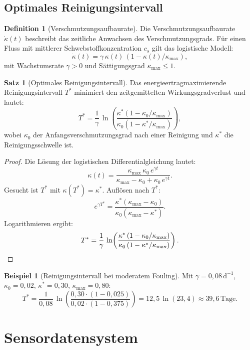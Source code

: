 ﻿\documentclass[a4paper,12pt]{article}
\theoremstyle{definition}
\newtheorem{definition}{Definition}
\newtheorem{beispiel}{Beispiel}
\newtheorem{satz}{Satz}
\begin{document}
\subsection{Optimales Reinigungsintervall}

\begin{definition}[Verschmutzungsaufbaurate]
Die Verschmutzungsaufbaurate $\dot{\kappa}(t)$ beschreibt das zeitliche Anwachsen des
Verschmutzungsgrads. Für einen Fluss mit mittlerer Schwebstoffkonzentration $c_s$
gilt das logistische Modell:
\[
  \dot{\kappa}(t) = \gamma\,\kappa(t)\,(1 - \kappa(t)/\kappa_{\max}),
\]
mit Wachstumsrate $\gamma > 0$ und Sättigungsgrad $\kappa_{\max} \leq 1$.
\end{definition}

\begin{satz}[Optimales Reinigungsintervall]
\label{satz:reinigung}
Das energieertragmaximierende Reinigungsintervall $T^*$ minimiert den zeitgemittelten
Wirkungsgradverlust und lautet:
\[
  T^* = \frac{1}{\gamma}\,\ln\!\left(\frac{\kappa^*(1 - \kappa_0/\kappa_{\max})}
       {\kappa_0(1 - \kappa^*/\kappa_{\max})}\right),
\]
wobei $\kappa_0$ der Anfangsverschmutzungsgrad nach einer Reinigung und $\kappa^*$ die
Reinigungsschwelle ist.
\end{satz}

\begin{proof}
Die Lösung der logistischen Differentialgleichung lautet:
\[
  \kappa(t) = \frac{\kappa_{\max}\,\kappa_0\,e^{\gamma t}}
              {\kappa_{\max} - \kappa_0 + \kappa_0\,e^{\gamma t}}.
\]
Gesucht ist $T^*$ mit $\kappa(T^*) = \kappa^*$. Auflösen nach $T^*$:
\[
  e^{\gamma T^*} = \frac{\kappa^*(\kappa_{\max} - \kappa_0)}{\kappa_0(\kappa_{\max} - \kappa^*)}.
\]
Logarithmieren ergibt:
\[
  T^* = \frac{1}{\gamma}\,\ln\!\left(\frac{\kappa^*\,(1 - \kappa_0/\kappa_{\max})}
       {\kappa_0\,(1 - \kappa^*/\kappa_{\max})}\right). \qedhere
\]
\end{proof}

\begin{beispiel}[Reinigungsintervall bei moderatem Fouling]
Mit $\gamma = 0{,}08\,\mathrm{d}^{-1}$, $\kappa_0 = 0{,}02$, $\kappa^* = 0{,}30$,
$\kappa_{\max} = 0{,}80$:
\[
  T^* = \frac{1}{0{,}08}\,\ln\!\left(\frac{0{,}30 \cdot (1 - 0{,}025)}
       {0{,}02 \cdot (1 - 0{,}375)}\right)
     = 12{,}5\,\ln(23{,}4) \approx 39{,}6\,\mathrm{Tage}.
\]
\end{beispiel}

\section{Sensordatensystem}
\end{document}
